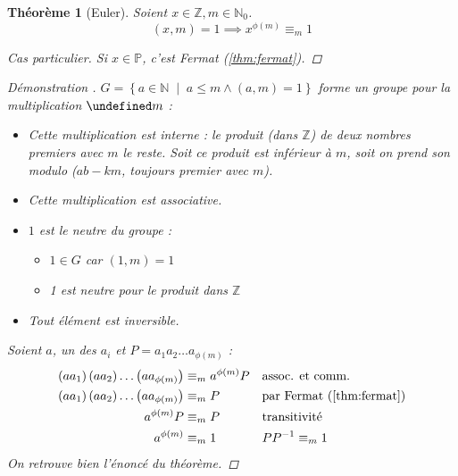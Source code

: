 \documentclass[11pt,twocolumn]{article}
\let\mod\undefined
\DeclareMathOperator{\mod}{mod}
\theoremstyle{plain}
\newtheorem{thm}{Théorème}
\newcommand{\esP}{\mathbb{P}} %
\newcommand{\esN}{\mathbb{N}} %
\newcommand{\esZ}{\mathbb{Z}} %
\newenvironment{cproof}[1]{\begin{proof}[Démonstration \cite{#1}]}{\end{proof}}
\begin{document}
\begin{thm}[Euler]\label{thm:euler}
	Soient $x \in \esZ, m \in \esN_0$. \[
		(x,m) = 1 \implies x^{\phi(m)} \equiv_m 1
	\]
	\begin{proof}[Cas particulier]
		Si $x \in \esP$, c'est Fermat (\ref{thm:fermat}).
	\end{proof}
	\begin{cproof}{Buys}
		$G=\left\{a\in\esN \; \middle| \; a \leq m \land (a,m)=1\right\}$
		forme un groupe pour la multiplication $\mod m$ :
		\begin{itemize}
			\item Cette multiplication est interne : le produit (dans $\esZ$)
				de deux nombres premiers avec $m$ le reste.
				Soit ce produit est inférieur à $m$,
				soit on prend son modulo ($ab-km$, toujours premier avec $m$).
			\item Cette multiplication est associative.
			\item $1$ est le neutre du groupe :
				\begin{itemize}
					\item $1\in G$ car $(1,m)=1$
					\item 1 est neutre pour le produit dans $\esZ$
				\end{itemize}
			\item Tout élément est inversible.
		\end{itemize}
		Soient $a$, un des $a_i$ et $P=a_1a_2\dots a_{\phi(m)}$ :
		\begin{align*}
			\left(aa_1\right)\left(aa_2\right)\dots\left(aa_{\phi(m)}\right)
			&\equiv_m a^{\phi(m)}P && \text{assoc. et comm.} \\
			\left(aa_1\right)\left(aa_2\right)\dots\left(aa_{\phi(m)}\right)
			&\equiv_m P && \text{par Fermat (\ref{thm:fermat})} \\
			a^{\phi(m)}P &\equiv_m P && \text{transitivité} \\
			a^{\phi(m)} &\equiv_m 1 && PP^{-1}\equiv_m1
		\end{align*}
		On retrouve bien l'énoncé du théorème.
	\end{cproof}
\end{thm}
\end{document}
